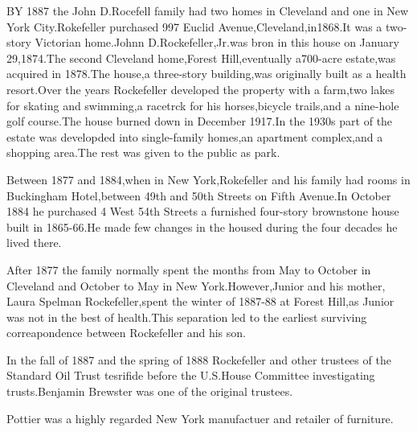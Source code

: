 \documentclass[11pt, oneside]{letter}   	%
\begin{document}
\begin{letter}{}
\setlength{\parindent}{0.5cm}
BY 1887 the John D.Rocefell family had two homes in Cleveland and one in New York City.Rokefeller purchased 997 Euclid Avenue,Cleveland,in1868.It was a two-story Victorian home.Johnn D.Rockefeller,Jr.was bron in this house on January 29,1874.The second Cleveland home,Forest Hill,eventually a700-acre estate,was acquired in 1878.The house,a three-story building,was originally built as a health resort.Over the years Rockefeller developed the property with a farm,two lakes for skating and swimming,a racetrck for his horses,bicycle trails,and a nine-hole golf course.The house burned down in December 1917.In the 1930s part of the estate was developded into single-family homes,an apartment complex,and a shopping area.The rest was given to the public as park.

Between 1877 and 1884,when in New York,Rokefeller and his family had rooms in Buckingham Hotel,between 49th and 50th Streets on Fifth Avenue.In October 1884 he purchased 4 West 54th Streets a furnished four-story brownstone house built in 1865-66.He made few changes in the housed during the four decades he lived there.

After 1877 the family normally spent the months from May to October in Cleveland and October to May in New York.However,Junior and his mother, Laura Spelman Rockefeller,spent the winter of 1887-88 at Forest Hill,as Junior was not in the best of health.This separation led to the earliest surviving correapondence between Rockefeller and his son.

In the fall of 1887 and the spring of 1888 Rockefeller and other trustees of the Standard Oil Trust tesrifide before the U.S.House Committee investigating trusts.Benjamin Brewster was one of the original trustees.

Pottier was a highly regarded New York manufactuer and retailer of furniture.

\end{letter}
\end{document}
